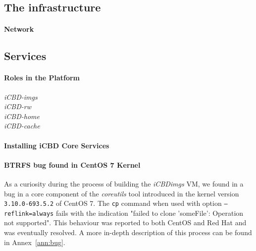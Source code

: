 \subsection{The infrastructure}
\label{sub:impl_infrastructure}



\paragraph{Network}
\label{par:impl_infra_network}



\subsection{Services}
\label{sub:impl_cache_services}

\paragraph{Roles in the Platform}
\label{par:impl_roles}

\begin{description}
	\item [\textit{iCBD-imgs}]
	\item [\textit{iCBD-rw}]
	\item [\textit{iCBD-home}]
	\item [\textit{iCBD-cache}]
\end{description}


\paragraph{Installing iCBD Core Services}
\label{par:impl_install_icbd_core}

\paragraph{BTRFS bug found in CentOS 7 Kernel}
\label{par:impl_centos_bug}

As a curiosity during the process of building the \textit{iCBDimgs} VM, we found in a bug in a core component of the \textit{coreutils} tool introduced in the kernel version \texttt{3.10.0-693.5.2} of CentOS 7. The \texttt{cp} command when used with option \texttt{--reflink=always} fails with the indication "failed to clone 'someFile': Operation not supported". This behaviour was reported to both CentOS and Red Hat and was eventually resolved. A more in-depth description of this process can be found in Annex~\ref{ann:bug}.







